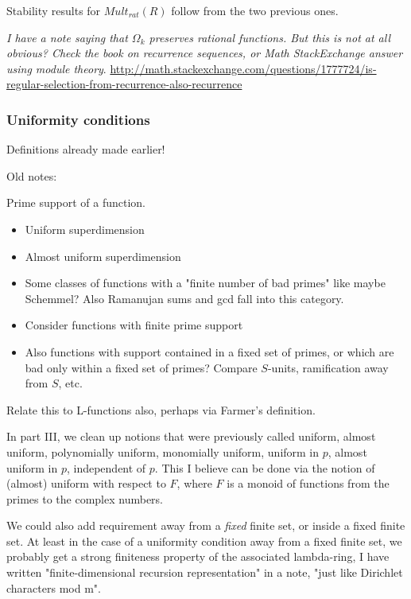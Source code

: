 \begin{remark}
Stability results for $Mult_{rat}(R)$ follow from the two previous ones.
\end{remark}




\emph{I have a note saying that $\Omega_k$ preserves rational functions. But this is not at all obvious? Check the book on recurrence sequences, or Math StackExchange answer using module theory}.
\url{http://math.stackexchange.com/questions/1777724/is-regular-selection-from-recurrence-also-recurrence}


\subsubsection{Uniformity conditions}

Definitions already made earlier!

Old notes:


\begin{definition}
Prime support of a function.
\end{definition}

\begin{itemize}
\item Uniform superdimension
\item Almost uniform superdimension
\item Some classes of functions with a "finite number of bad primes" like maybe Schemmel? Also Ramanujan sums and gcd fall into this category.
\item Consider functions with finite prime support
\item Also functions with support contained in a fixed set of primes, or which are bad only within a fixed set of primes? Compare $S$-units, ramification away from $S$, etc. 
\end{itemize}
Relate this to L-functions also, perhaps via Farmer's definition.



In part III, we clean up notions that were previously called uniform, almost uniform, polynomially uniform, monomially uniform, uniform in $p$, almost uniform in $p$, independent of $p$. This I believe can be done via the notion of (almost) uniform with respect to $F$, where $F$ is a monoid of functions from the primes to the complex numbers. 

We could also add requirement away from a \emph{fixed} finite set, or inside a fixed finite set. At least in the case of a uniformity condition away from a fixed finite set, we probably get a strong finiteness property of the associated lambda-ring, I have written "finite-dimensional recursion representation" in a note, "just like Dirichlet characters mod m". 


